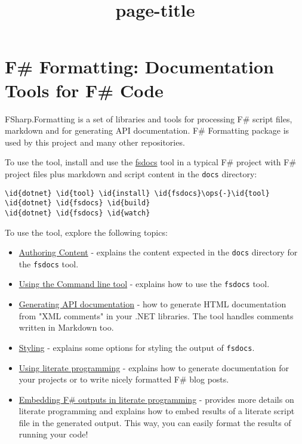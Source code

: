 \documentclass{article}
\title{{page-title}}
\date{}
\newcommand{\id}[1]{\textcolor{black}{#1}}
\newcommand{\ops}[1]{\textcolor{purple}{#1}}
\begin{document}
\maketitle

\section*{F\# Formatting: Documentation Tools for F\# Code}



FSharp.Formatting is a set of libraries and tools for processing F\# script files, markdown and for
generating API documentation. F\# Formatting package is used by this project and many other repositories.


To use the tool, install and use the \href{commandline.html}{fsdocs} tool in a typical F\# project with
F\# project files plus markdown and script content in the \texttt{docs} directory:
\begin{Verbatim}[commandchars=\\\{\}]
\id{dotnet} \id{tool} \id{install} \id{fsdocs}\ops{-}\id{tool}
\id{dotnet} \id{fsdocs} \id{build} 
\id{dotnet} \id{fsdocs} \id{watch}

\end{Verbatim}



To use the tool, explore the following topics:
\begin{itemize}
\item 

\href{content.html}{Authoring Content} - explains the content expected in the \texttt{docs} directory for the \texttt{fsdocs} tool.

\item 

\href{commandline.html}{Using the Command line tool} - explains how to use the \texttt{fsdocs} tool.

\item 

\href{apidocs.html}{Generating API documentation} - how to generate HTML documentation
from "XML comments" in your .NET libraries. The tool handles comments written in
Markdown too.

\item 

\href{styling.html}{Styling} - explains some options for styling the output of \texttt{fsdocs}.

\item 

\href{literate.html}{Using literate programming} - explains how to generate documentation
for your projects or to write nicely formatted F\# blog posts.

\item 

\href{evaluation.html}{Embedding F\# outputs in literate programming} - provides more details on literate programming and
explains how to embed results of a literate script file in the generated output. This way,
you can easily format the results of running your code!

\end{itemize}
\end{document}
